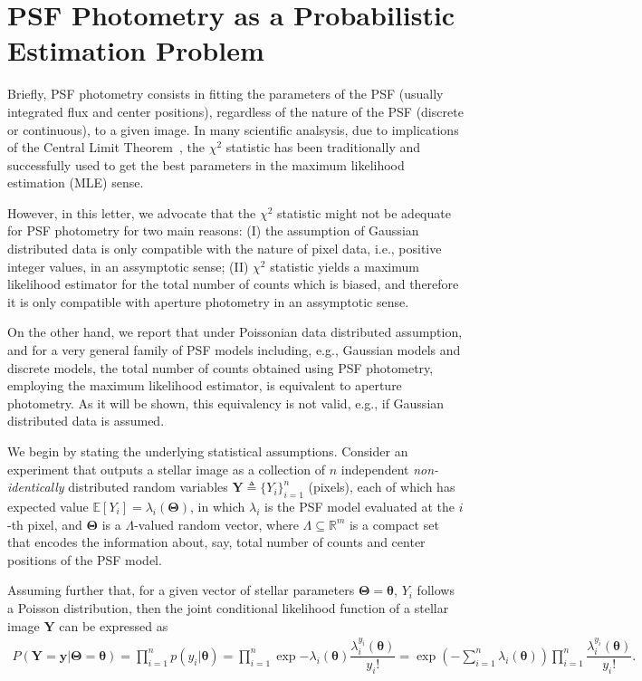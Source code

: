 \documentclass{rnaastex}
\begin{document}
\section{PSF Photometry as a Probabilistic Estimation Problem}

Briefly, PSF photometry consists in fitting the parameters of the PSF
(usually integrated flux and center positions), regardless of the nature of the
PSF (discrete or continuous), to a given image. In many scientific analsysis,
due to implications of the Central Limit Theorem~\citep{grimmett:2001}, the
$\chi^2$ statistic has been traditionally and successfully used to get the best
parameters in the maximum likelihood estimation (MLE) sense.

However, in this letter, we advocate that the $\chi^2$ statistic might not be adequate for PSF
photometry for two main reasons: (I) the assumption of Gaussian distributed data is only
compatible with the nature of pixel data, i.e., positive integer values, in an assymptotic sense;
(II) $\chi^2$ statistic yields a maximum likelihood estimator for the total number of counts
which is biased, and therefore it is only compatible with aperture photometry in an assymptotic sense.

On the other hand, we report that under Poissonian data distributed assumption, and for a very
general family of PSF models including, e.g., Gaussian models and discrete models,
the total number of counts obtained using PSF photometry, employing the maximum likelihood
estimator, is equivalent to aperture photometry. As it will be shown, this equivalency is not
valid, e.g., if Gaussian distributed data is assumed.

We begin by stating the underlying statistical assumptions.
Consider an experiment that outputs a stellar image as a collection of $n$ independent \emph{non-identically}
distributed random variables $\bm{Y} \triangleq \{Y_i\}_{i=1}^{n}$ (pixels), each of which has expected value
$\mathbb{E}\left[Y_i\right] = \lambda_i(\bm{\Theta})$, in which $\lambda_i$ is the PSF model evaluated
at the $i$-th pixel, and $\bm{\Theta}$ is a $\Lambda$-valued random vector, where
$\Lambda \subseteq \mathbb{R}^m$ is a compact set that encodes the information about, say, total number
of counts and center positions of the PSF model.

Assuming further that, for a given vector of stellar parameters $\bm{\Theta} = \bm{\theta}$,
$Y_i$ follows a Poisson distribution, then the joint conditional likelihood function of a
stellar image $\bm{Y}$ can be expressed as~\citep{grimmett:2001}
\begin{align}
    P(\bm{Y} = \bm{y} | \bm{\Theta} = \bm{\theta}) = \prod_{i=1}^{n} p(y_i | \bm{\theta}) = \prod_{i=1}^{n} \exp{-\lambda_i(\bm{\theta})}\dfrac{\lambda_i^{y_i}(\bm{\theta})}{y_i!} = \exp\left({-\sum_{i=1}^{n}\lambda_i(\bm{\theta})}\right)\prod_{i=1}^{n}\dfrac{\lambda_i^{y_i}(\bm{\theta})}{y_i!}.
\end{align}
\end{document}
